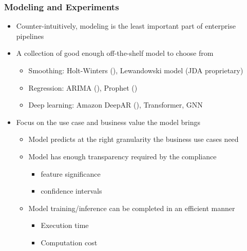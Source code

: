 \documentclass[aspectratio=169,xcolor=x11names,table]{beamer}
\begin{document}
\begin{frame}
	\frametitle{Modeling and Experiments}
	\begin{itemize}
		\item<1> Counter-intuitively, modeling is the least important part of enterprise pipelines
		\item<1> A collection of good enough off-the-shelf model to choose from
			\begin{itemize}
				\item Smoothing: Holt-Winters (\cite{winters1960forecasting}), Lewandowski model (JDA proprietary)
				\item Regression: ARIMA (\cite{ho1998use}), Prophet (\cite{taylor2018forecasting})
				\item Deep learning: Amazon DeepAR (\cite{salinas2020deepar}), Transformer, GNN
			\end{itemize}
			\vspace{3mm}
		\item<2> Focus on the use case and business value the model brings
			\begin{itemize}
				\item Model predicts at the right granularity the business use cases need
				\item Model has enough transparency required by the compliance 
					\begin{itemize}
						\item feature significance
						\item confidence intervals
					\end{itemize}
				\item Model training/inference can be completed in an efficient manner 
					\begin{itemize}
						\item Execution time
						\item Computation cost
					\end{itemize}
			\end{itemize}
	\end{itemize}
\end{frame}
\end{document}
